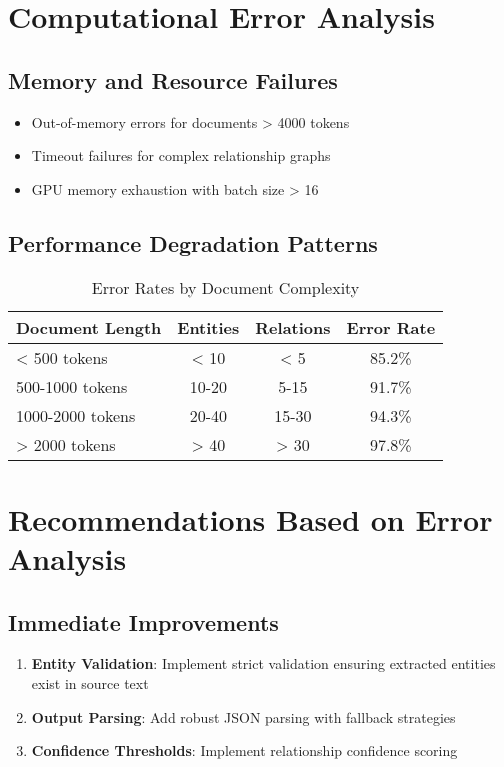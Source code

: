 \section{Computational Error Analysis}

\subsection{Memory and Resource Failures}

\begin{itemize}
    \item Out-of-memory errors for documents > 4000 tokens
    \item Timeout failures for complex relationship graphs
    \item GPU memory exhaustion with batch size > 16
\end{itemize}

\subsection{Performance Degradation Patterns}

\begin{table}[htbp]
\centering
\caption{Error Rates by Document Complexity}
\label{tab:complexity-errors}
\begin{tabular}{lccc}
\toprule
\textbf{Document Length} & \textbf{Entities} & \textbf{Relations} & \textbf{Error Rate} \\
\midrule
< 500 tokens & < 10 & < 5 & 85.2\% \\
500-1000 tokens & 10-20 & 5-15 & 91.7\% \\
1000-2000 tokens & 20-40 & 15-30 & 94.3\% \\
> 2000 tokens & > 40 & > 30 & 97.8\% \\
\bottomrule
\end{tabular}
\end{table}

\section{Recommendations Based on Error Analysis}

\subsection{Immediate Improvements}
\begin{enumerate}
    \item \textbf{Entity Validation}: Implement strict validation ensuring extracted entities exist in source text
    \item \textbf{Output Parsing}: Add robust JSON parsing with fallback strategies
    \item \textbf{Confidence Thresholds}: Implement relationship confidence scoring
\end{enumerate}

